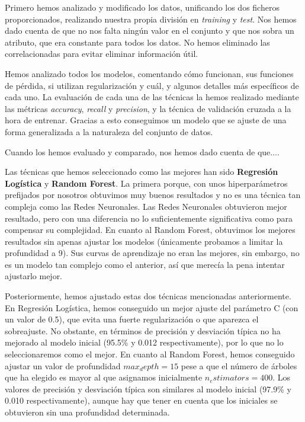 \documentclass[11pt,a4paper]{article}
\begin{document}
Primero hemos analizado y modificado los datos, unificando los dos ficheros proporcionados, realizando nuestra propia división en \textit{training} y \textit{test}. Nos hemos dado cuenta de que no nos falta ningún valor en el conjunto y que nos sobra un atributo, que era constante para todos los datos. No hemos eliminado las correlacionadas para evitar eliminar información útil.

Hemos analizado todos los modelos, comentando cómo funcionan, sus funciones de pérdida, si utilizan regularización y cuál, y algunos detalles más específicos de cada uno. La evaluación de cada una de las técnicas la hemos realizado mediante las métricas \textit{accuracy}, \textit{recall} y \textit{precision}, y la técnica de validación cruzada a la hora de entrenar. Gracias a esto conseguimos un modelo que se ajuste de una forma generalizada a la naturaleza del conjunto de datos.

Cuando los hemos evaluado y comparado, nos hemos dado cuenta de que....

Las técnicas que hemos seleccionado como las mejores han sido \textbf{Regresión Logística} y \textbf{Random Forest}. La primera porque, con unos hiperparámetros prefijados por nosotros obtuvimos muy buenos resultados y no es una técnica tan compleja como las Redes Neuronales. Las Redes Neuronales obtuvieron mejor resultado, pero con una diferencia no lo suficientemente significativa como para compensar su complejidad. En cuanto al Random Forest, obtuvimos los mejores resultados sin apenas ajustar los modelos (únicamente probamos a limitar la profundidad a 9). Sus curvas de aprendizaje no eran las mejores, sin embargo, no es un modelo tan complejo como el anterior, así que merecía la pena intentar ajustarlo mejor.

Posteriormente, hemos ajustado estas dos técnicas mencionadas anteriormente. En Regresión Logística, hemos conseguido un mejor ajuste del parámetro C (con un valor de 0.5), que evita una fuerte regularización o que aparezca el sobreajuste. No obstante, en términos de precisión y desviación típica no ha mejorado al modelo inicial (95.5\% y 0.012 respectivamente), por lo que no lo seleccionaremos como el mejor. En cuanto al Random Forest, hemos conseguido ajustar un valor de profundidad $max_depth = 15$ pese a que el número de árboles que ha elegido es mayor al que asignamos inicialmente $n_estimators = 400$. Los valores de precisión y desviación típica son similares al modelo inicial (97.9\% y 0.010 respectivamente), aunque hay que tener en cuenta que los iniciales se obtuvieron sin una profundidad determinada.
\end{document}

